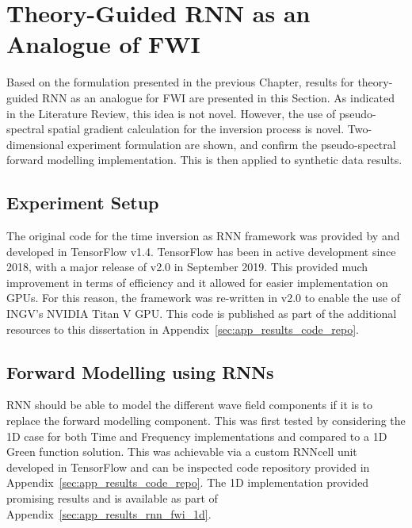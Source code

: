 \clearpage
\section[RNN as an Analogue of FWI]{Theory-Guided RNN as an Analogue of FWI}
Based on the formulation presented in the previous Chapter, results for theory-guided RNN as an analogue for FWI are presented in this Section. As indicated in the Literature Review, this idea is not novel. However, the use of pseudo-spectral spatial gradient calculation for the inversion process is novel. Two-dimensional experiment formulation are shown, and confirm the pseudo-spectral forward modelling implementation. This is then applied to synthetic data results.

\subsection{Experiment Setup}
The original code for the time inversion as RNN framework was provided by \cite{Richardson2018} and developed in TensorFlow v1.4. TensorFlow has been in active development since 2018, with a major release of v2.0 in September 2019. This provided much improvement in terms of efficiency and it allowed for easier implementation on GPUs. For this reason, the framework was re-written in v2.0 to enable the use of INGV’s NVIDIA Titan V GPU. This code is published as part of the additional resources to this dissertation in Appendix~\ref{sec:app_results_code_repo}.

\subsection{Forward Modelling using RNNs}\label{sec:results_forward_modelling_using_rnnd}
RNN should be able to model the different wave field components if it is to replace the forward modelling component. This was first tested by considering the 1D case for both Time and Frequency implementations and compared to a 1D Green function solution. This was achievable via a custom RNNcell unit developed in TensorFlow and can be inspected code repository provided in Appendix~\ref{sec:app_results_code_repo}. The 1D implementation provided promising results and is available as part of Appendix~\ref{sec:app_results_rnn_fwi_1d}.

